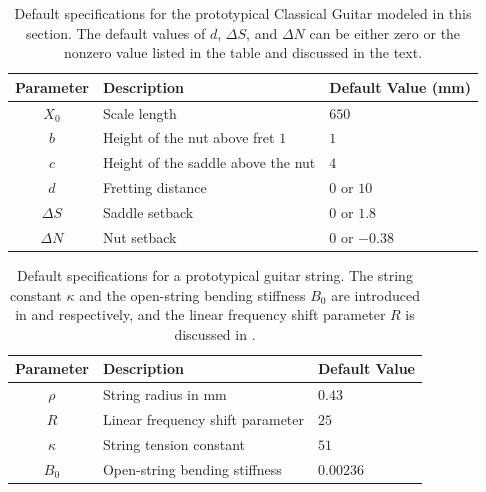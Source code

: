\begin{table}%
  \centering
  \caption{\label{tbl:mcg_specs} Default specifications for the prototypical Classical Guitar modeled in this section. The default values of $d$, $\Delta S$, and $\Delta N$ can be either zero or the nonzero value listed in the table and discussed in the text.}
  \begin{tabular}{cll}
    \toprule
    Parameter & Description & Default Value (mm) \\
    \midrule
    $X_0$ & Scale length& $650$ \\
    $b$ & Height of the nut above fret $1$& $1$ \\
    $c$ & Height of the saddle above the nut & $4$ \\
    $d$ & Fretting distance & $0$ or $10$ \\
    $\Delta S$ & Saddle setback & $0$ or $1.8$ \\
    $\Delta N$ & Nut setback & $0$ or $-0.38$ \\
    \bottomrule
  \end{tabular}
\end{table}%

\begin{table}%
  \centering
  \caption{\label{tbl:string_specs} Default specifications for a prototypical guitar string. The string constant $\kappa$ and the open-string bending stiffness $B_0$ are introduced in  and  respectively, and the linear frequency shift parameter $R$ is discussed in .}
  \begin{tabular}{cll}
    \toprule
    Parameter & Description & Default Value \\
    \midrule
    $\rho$ & String radius in mm & $0.43$ \\
    $R$ & Linear frequency shift parameter & $25$ \\
    $\kappa$ & String tension constant & $51$ \\
    $B_0$ & Open-string bending stiffness & $0.00236$ \\
    \bottomrule
  \end{tabular}
\end{table}%

